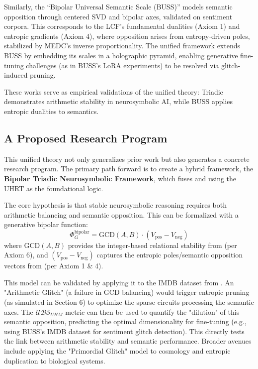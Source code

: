 \documentclass[11pt, a4paper]{article}
\begin{document}
		Similarly, the ``Bipolar Universal Semantic Scale (BUSS)'' \cite{BUSS} models semantic opposition through centered SVD and bipolar axes, validated on sentiment corpora. This corresponds to the LCF's fundamental dualities (Axiom 1) and entropic gradients (Axiom 4), where opposition arises from entropy-driven poles, stabilized by MEDC's inverse proportionality. The unified framework extends BUSS by embedding its scales in a holographic pyramid, enabling generative fine-tuning challenges (as in BUSS's LoRA experiments) to be resolved via glitch-induced pruning.
		
		These works serve as empirical validations of the unified theory: Triadic demonstrates arithmetic stability in neurosymbolic AI, while BUSS applies entropic dualities to semantics.
		
		
		\subsection{A Proposed Research Program}
		This unified theory not only generalizes prior work but also generates a concrete research program. The primary path forward is to create a hybrid framework, the \textbf{Bipolar Triadic Neurosymbolic Framework}, which fuses \cite{Triadic} and \cite{BUSS} using the UHRT as the foundational logic.
		
		The core hypothesis is that stable neurosymbolic reasoning requires both arithmetic balancing and semantic opposition. This can be formalized with a generative bipolar function:
		\[
		\Phi_G^{\text{bipolar}} = \text{GCD}(A, B) \cdot (V_{\text{pos}} - V_{\text{neg}})
		\]
		where $\text{GCD}(A, B)$ provides the integer-based relational stability from \cite{Triadic} (per Axiom 6), and $(V_{\text{pos}} - V_{\text{neg}})$ captures the entropic poles/semantic opposition vectors from \cite{BUSS} (per Axiom 1 \& 4).
		
		This model can be validated by applying it to the IMDB dataset from \cite{BUSS}. An "Arithmetic Glitch" (a failure in GCD balancing) would trigger entropic pruning (as simulated in Section 6) to optimize the sparse circuits \cite{Anthropic_SparseCircuits} processing the semantic axes. The $\mathcal{UBS}_{UHM}$ metric can then be used to quantify the "dilution" of this semantic opposition, predicting the optimal dimensionality for fine-tuning (e.g., using BUSS's IMDB dataset for sentiment glitch detection). This directly tests the link between arithmetic stability and semantic performance. Broader avenues include applying the "Primordial Glitch" model to cosmology \cite{verlinde2010} and entropic duplication to biological systems.
		
\end{document}
